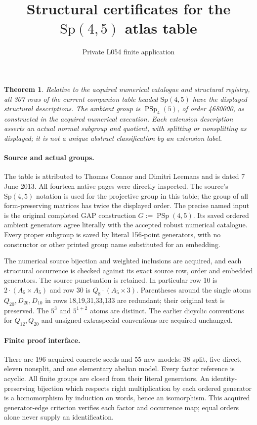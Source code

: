 \documentclass[11pt]{article}
\title{Structural certificates for the $\mathrm{Sp}(4,5)$ atlas table}
\author{Private L054 finite application}\date{}
\newtheorem{theorem}{Theorem}
\begin{document}
\maketitle
\begin{theorem}
Relative to the acquired numerical catalogue and structural registry,
all 307 rows of the current companion table headed $\mathrm{Sp}(4,5)$ have
the displayed structural descriptions. The ambient group is
$\operatorname{PSp}_4(5)$, of order 4680000, as constructed in the acquired
numerical execution. Each extension description asserts an actual
normal subgroup and quotient, with splitting or nonsplitting as displayed;
it is not a unique abstract classification by an extension label.
\end{theorem}

\paragraph{Source and actual groups.}
The table is attributed to Thomas Connor and Dimitri Leemans and is dated
7 June 2013. All fourteen native pages were directly inspected. The source's
$\mathrm{Sp}(4,5)$ notation is used for the projective group in this table;
the group of all form-preserving matrices has twice the displayed order.
The precise named input is the original completed GAP construction
$G:=\operatorname{PSp}(4,5)$. Its saved ordered ambient generators agree
literally with the accepted robust numerical catalogue. Every proper
subgroup is saved by literal 156-point generators, with no constructor or
other printed group name substituted for an embedding.

The numerical source bijection and weighted inclusions are acquired, and
each structural occurrence is checked against its exact source row,
order and embedded generators. The source punctuation is retained. In
particular row 10 is $2\mathbin{\cdot}(A_5\times A_5)$ and row 30 is
$Q_8\mathbin{\cdot}(A_5\times3)$. Parentheses around the single atoms
$Q_{20},D_{20},D_{10}$ in rows 18,19,31,33,133 are redundant; their original
text is preserved. The $5^3$ and $5^{1+2}$ atoms are distinct. The earlier
dicyclic conventions for $Q_{12},Q_{20}$ and unsigned extraspecial
conventions are acquired unchanged.

\paragraph{Finite proof interface.}
There are 196 acquired concrete seeds and 55 new models: 38 split, five
direct, eleven nonsplit, and one elementary abelian model. Every factor
reference is acyclic. All finite groups are closed from their literal
generators. An identity-preserving bijection which respects right
multiplication by each ordered generator is a homomorphism by induction
on words, hence an isomorphism. This acquired generator-edge criterion
verifies each factor and occurrence map; equal orders alone never supply
an identification.
\end{document}
